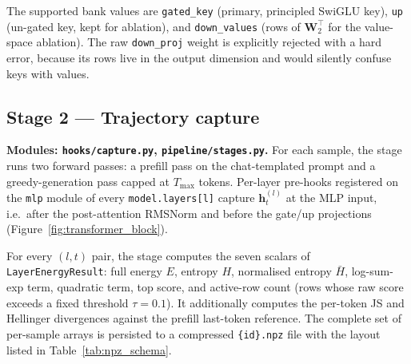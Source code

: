 The supported bank values are \texttt{gated\_key} (primary, principled
SwiGLU key), \texttt{up} (un-gated key, kept for ablation), and
\texttt{down\_values} (rows of $\mathbf{W}_2^\top$ for the value-space
ablation). The raw \texttt{down\_proj} weight is explicitly rejected with
a hard error, because its rows live in the output dimension and would
silently confuse keys with values.

\subsection{Stage 2 — Trajectory capture}
\label{subsec:stage2}

\textbf{Modules: \texttt{hooks/capture.py}, \texttt{pipeline/stages.py}.}
For each sample, the stage runs two forward passes: a prefill pass on the
chat-templated prompt and a greedy-generation pass capped at $T_{\max}$
tokens. Per-layer pre-hooks registered on the \texttt{mlp} module of every
\texttt{model.layers[l]} capture $\mathbf{h}_t^{(l)}$ at the MLP input,
i.e.\ after the post-attention RMSNorm and before the gate/up projections
(Figure~\ref{fig:transformer_block}).

For every $(l, t)$ pair, the stage computes the seven scalars of
\texttt{LayerEnergyResult}: full energy $E$, entropy $H$, normalised
entropy $\bar{H}$, log-sum-exp term, quadratic term, top score, and
active-row count (rows whose raw score exceeds a fixed threshold
$\tau = 0.1$). It additionally computes the per-token JS and Hellinger
divergences against the prefill last-token reference. The complete set
of per-sample arrays is persisted to a compressed \texttt{\{id\}.npz}
file with the layout listed in Table~\ref{tab:npz_schema}.


